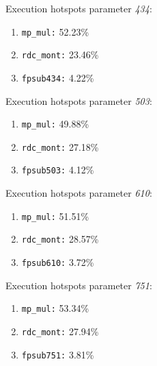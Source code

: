 Execution hotspots parameter \textit{434}:
\begin{enumerate}[noitemsep]
	\item \texttt{mp\_mul:} 52.23\%
	\item \texttt{rdc\_mont:} 23.46\%
	\item \texttt{fpsub434:} 4.22\%
\end{enumerate}
Execution hotspots parameter \textit{503}:
\begin{enumerate}[noitemsep]
	\item \texttt{mp\_mul:} 49.88\%
	\item \texttt{rdc\_mont:} 27.18\%
	\item \texttt{fpsub503:} 4.12\%
\end{enumerate}
Execution hotspots parameter \textit{610}:
\begin{enumerate}[noitemsep]
	\item \texttt{mp\_mul:} 51.51\%
	\item \texttt{rdc\_mont:} 28.57\%
	\item \texttt{fpsub610:} 3.72\%
\end{enumerate}
Execution hotspots parameter \textit{751}:
\begin{enumerate}[noitemsep]
	\item \texttt{mp\_mul:} 53.34\%
	\item \texttt{rdc\_mont:} 27.94\%
	\item \texttt{fpsub751:} 3.81\%
\end{enumerate}
